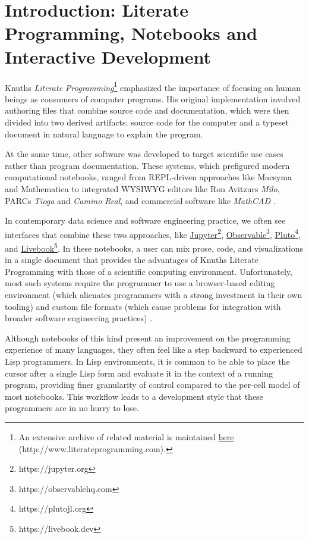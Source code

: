 \documentclass[sigconf,screen]{acmart}
\begin{document}
\hypertarget{introduction:-literate-programmingux2c-notebooks-and-interactive-development}{%
\section{Introduction: Literate Programming, Notebooks and Interactive Development}\label{introduction:-literate-programmingux2c-notebooks-and-interactive-development}}

Knuth\textquotesingle s \emph{Literate Programming}\footnote{An extensive archive of related material is maintained {\href{http://www.literateprogramming.com}{here} (http://www.literateprogramming.com)}.} \cite{Knuth_1984} emphasized the importance of focusing on human beings as consumers of computer programs. His original implementation involved authoring files that combine source code and documentation, which were then divided into two derived artifacts: source code for the computer and a typeset document in natural language to explain the program.

At the same time, other software was developed to target scientific use cases rather than program documentation. These systems, which prefigured modern computational notebooks, ranged from REPL-driven approaches like Macsyma and Mathematica to integrated WYSIWYG editors like Ron Avitzur\textquotesingle s \emph{Milo}, PARC\textquotesingle s \emph{Tioga} and \emph{Camino Real}, and commercial software like \emph{MathCAD} \cite{Kajler_1998}.

In contemporary data science and software engineering practice, we often see interfaces that combine these two approaches, like {\href{https://jupyter.org}{Jupyter}\footnote{https://jupyter.org}}, {\href{https://observablehq.com}{Observable}\footnote{https://observablehq.com}}, {\href{https://plutojl.org}{Pluto}\footnote{https://plutojl.org}}, and {\href{https://livebook.dev}{Livebook}\footnote{https://livebook.dev}}. In these notebooks, a user can mix prose, code, and visualizations in a single document that provides the advantages of Knuth\textquotesingle s Literate Programming with those of a scientific computing environment. Unfortunately, most such systems require the programmer to use a browser-based editing environment (which alienates programmers with a strong investment in their own tooling) and custom file formats (which cause problems for integration with broader software engineering practices) \cite{Chattopadhyay_2020}.

Although notebooks of this kind present an improvement on the programming experience of many languages, they often feel like a step backward to experienced Lisp programmers. In Lisp environments, it is common to be able to place the cursor after a single Lisp form and evaluate it in the context of a running program, providing finer granularity of control compared to the per-cell model of most notebooks. This workflow leads to a development style that these programmers are in no hurry to lose.
\end{document}
